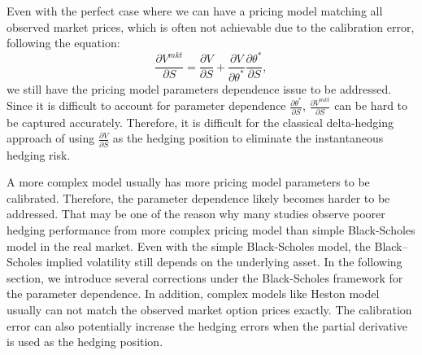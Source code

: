 \documentclass[letterpaper,12pt,titlepage,oneside,final]{book}
\numberwithin{equation}{section}
\theoremstyle{definition}
\newcommand{\Vmkt}{V^{mkt}}
\begin{document}
Even with the perfect case where we can have a pricing model matching all observed market prices, which is often not achievable due to the calibration error, following the equation:
\begin{equation} \label{mkt:d}
    \frac{\partial \Vmkt}{\partial S}=\frac{\partial V}{\partial S} + \frac{\partial V}{\partial \theta^*}\frac{\partial \theta^*}{\partial S},
\end{equation}
we still have  the pricing model parameters dependence issue to be addressed. Since it is difficult to account for parameter dependence $\frac{\partial \theta^*}{\partial S}$,  $\frac{\partial \Vmkt}{\partial S} $ can be hard to be captured accurately. Therefore, it is difficult for the classical delta-hedging approach of using $\frac{\partial V}{\partial S}$ as the hedging position to  eliminate the instantaneous hedging risk.

A more complex model usually has more pricing model parameters to be calibrated. Therefore, the parameter dependence likely becomes harder to be addressed. That may be one of the reason why many studies observe poorer hedging performance from more complex pricing model than simple Black-Scholes model in the real market. Even with the simple Black-Scholes model, the Black–Scholes implied volatility still depends on the underlying asset. In the following section, we introduce several corrections under the Black-Scholes framework for the parameter dependence. In addition, complex models like Heston model usually can not match the observed market option prices exactly. The calibration error can also potentially increase the hedging errors when the partial derivative is used as the hedging position.  
\end{document}
